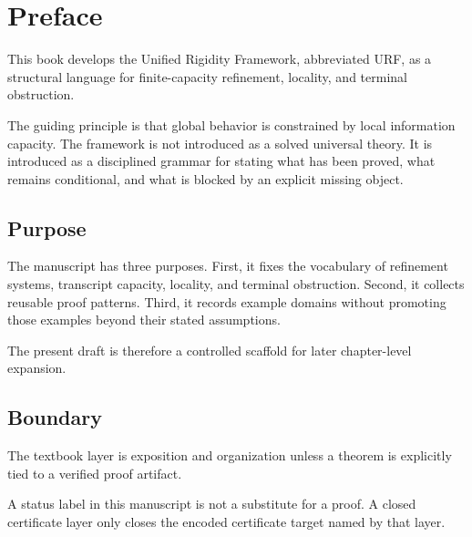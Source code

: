 \chapter*{Preface}

This book develops the Unified Rigidity Framework, abbreviated URF, as a structural language for finite-capacity refinement, locality, and terminal obstruction.

The guiding principle is that global behavior is constrained by local information capacity.  The framework is not introduced as a solved universal theory.  It is introduced as a disciplined grammar for stating what has been proved, what remains conditional, and what is blocked by an explicit missing object.

\section*{Purpose}

The manuscript has three purposes.  First, it fixes the vocabulary of refinement systems, transcript capacity, locality, and terminal obstruction.  Second, it collects reusable proof patterns.  Third, it records example domains without promoting those examples beyond their stated assumptions.

The present draft is therefore a controlled scaffold for later chapter-level expansion.

\section*{Boundary}

The textbook layer is exposition and organization unless a theorem is explicitly tied to a verified proof artifact.

\begin{remark}
A status label in this manuscript is not a substitute for a proof.  A closed certificate layer only closes the encoded certificate target named by that layer.
\end{remark}
